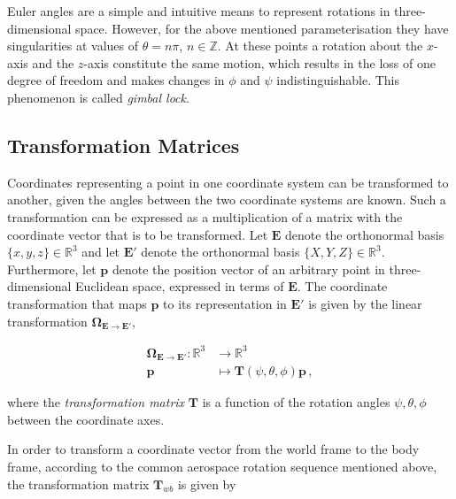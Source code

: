 Euler angles are a simple and intuitive means to represent rotations in three-dimensional space. However, for the above mentioned parameterisation they have singularities at values of $\theta = n \pi$, $n \in \mathbb{Z}$. At these points a rotation about the $x$-axis and the $z$-axis constitute the same motion, which results in the loss of one degree of freedom and makes changes in $\phi$ and $\psi$ indistinguishable. This phenomenon is called \emph{gimbal lock}.

\subsection{Transformation Matrices}

Coordinates representing a point in one coordinate system can be transformed to another, given the angles between the two coordinate systems are known. Such a transformation can be expressed as a multiplication of a matrix with the coordinate vector that is to be transformed. Let $\bm{E}$ denote the orthonormal basis $\{x, y, z\} \in \mathbb{R}^3$ and let $\bm{E}'$ denote the orthonormal basis $\{X, Y, Z\} \in \mathbb{R}^3$. Furthermore, let $\bm{p}$ denote the position vector of an arbitrary point in three-dimensional Euclidean space, expressed in terms of $\bm{E}$. The coordinate transformation that maps $\bm{p}$ to its representation in $\bm{E}'$ is given by the linear transformation $\bm{\Omega}_{\bm{E} \rightarrow \bm{E}'}$,

\begin{equation}\label{eq:transformation}
\begin{split}
  \bm{\Omega}_{\bm{E} \rightarrow \bm{E}'}: \mathbb{R}^3 &\rightarrow \mathbb{R}^3 \\
  \bm{p} &\mapsto \bm{T}(\psi, \theta, \phi) \bm{p} \,,
\end{split}
\end{equation}

\noindent
where the \emph{transformation matrix} $\bm{T}$ is a function of the rotation angles $\psi, \theta, \phi$ between the coordinate axes.

In order to transform a coordinate vector from the world frame to the body frame, according to the common aerospace rotation sequence mentioned above, the transformation matrix $\bm{T}_{wb}$ is given by


